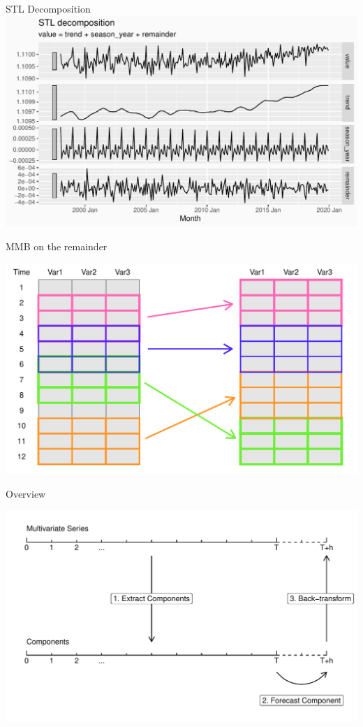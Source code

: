 \documentclass[14pt,ignorenonframetext,]{beamer}
\begin{document}
\begin{frame}{STL Decomposition}
\protect\hypertarget{stl-decomposition}{}
\includegraphics[width=\linewidth]{plot/p_stl}
\end{frame}

\begin{frame}{MMB on the remainder}
\protect\hypertarget{mmb-on-the-remainder}{}
\begin{center}
\includegraphics[width=\linewidth]{plot/p_mmb}
\end{center}
\end{frame}

\begin{frame}{Overview}
\protect\hypertarget{overview-2}{}
\begin{center}
\includegraphics[width=\linewidth]{plot/p_timeline}
\end{center}
\end{frame}
\end{document}
